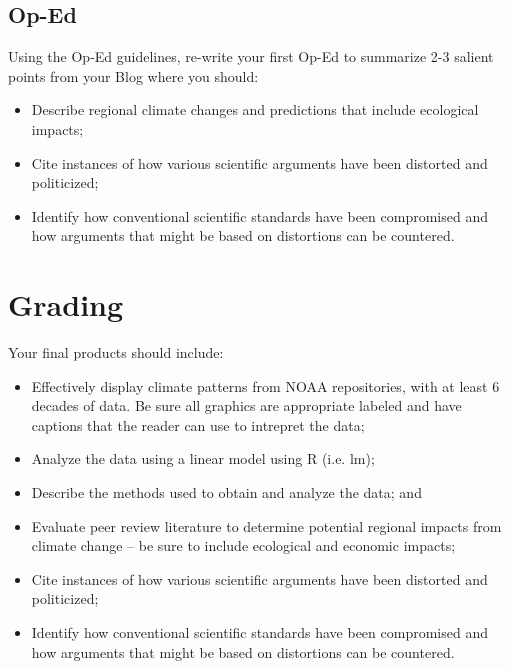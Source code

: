 \documentclass{article}\usepackage[]{graphicx}\usepackage[]{color}
\begin{document}
\subsection{Op-Ed}

Using the Op-Ed guidelines, re-write your first Op-Ed to summarize 2-3 salient points from your Blog where you should:

\begin{itemize}
  \item Describe regional climate changes and predictions that include ecological impacts; 
  \item Cite instances of how various scientific arguments have been distorted and politicized;
  \item Identify how conventional scientific standards have been compromised and how arguments that might be based on distortions can be countered.
\end{itemize}


\section{Grading}

Your final products should include:

\begin{itemize}
  \item Effectively display climate patterns from NOAA repositories, with at least 6 decades of data. Be sure all graphics are appropriate labeled and have captions that the reader can use to intrepret the data;
  \item Analyze the data using a linear model using R (i.e. lm);
  \item Describe the methods used to obtain and analyze the data; and
  \item Evaluate peer review literature to determine potential regional impacts from climate change -- be sure to include ecological and economic impacts; 
  \item Cite instances of how various scientific arguments have been distorted and politicized;
  \item Identify how conventional scientific standards have been compromised and how arguments that might be based on distortions can be countered.
\end{itemize}
\end{document}
